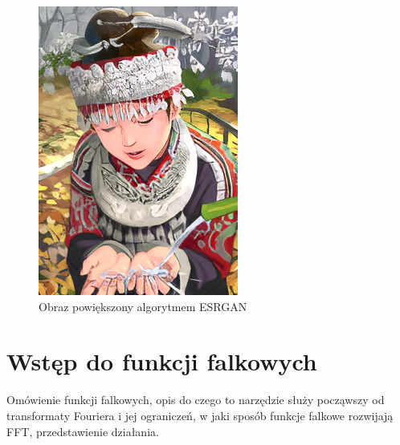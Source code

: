 \begin{figure}[ht]
\begin{minipage}[t]{0.3\linewidth}
        \includegraphics[width=\linewidth]{Rozdziały/02.Podstawy_teoretyczne/comic_ESRGAN_x4.png}
        \caption{Obraz powiększony algorytmem ESRGAN}
        \label{fig:image13}
    \end{minipage}
\end{figure}





\newpage
\section{Wstęp do funkcji falkowych}


Omówienie funkcji falkowych, opis do czego to narzędzie służy począwszy od transformaty Fouriera i jej ograniczeń, 
w jaki sposób funkcje falkowe rozwijają FFT, przedstawienie działania.





